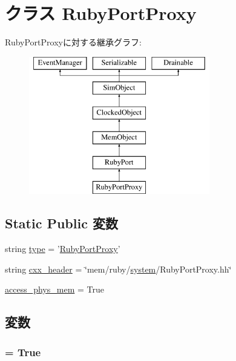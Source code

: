 \hypertarget{classSequencer_1_1RubyPortProxy}{
\section{クラス RubyPortProxy}
\label{classSequencer_1_1RubyPortProxy}
}
RubyPortProxyに対する継承グラフ:\begin{figure}[H]
\begin{center}
\leavevmode
\includegraphics[height=6cm]{classSequencer_1_1RubyPortProxy}
\end{center}
\end{figure}
\subsection*{Static Public 変数}
\begin{DoxyCompactItemize}
\item 
string \hyperlink{classSequencer_1_1RubyPortProxy_acce15679d830831b0bbe8ebc2a60b2ca}{type} = '\hyperlink{classSequencer_1_1RubyPortProxy}{RubyPortProxy}'
\item 
string \hyperlink{classSequencer_1_1RubyPortProxy_a17da7064bc5c518791f0c891eff05fda}{cxx\_\-header} = \char`\"{}mem/ruby/\hyperlink{classSequencer_1_1RubyPort_ab737471139f5a296e5b26e8a0e1b0744}{system}/RubyPortProxy.hh\char`\"{}
\item 
\hyperlink{classSequencer_1_1RubyPortProxy_a6b007d00105ce28d41448c23f68c5ec1}{access\_\-phys\_\-mem} = True
\end{DoxyCompactItemize}


\subsection{変数}
\hypertarget{classSequencer_1_1RubyPortProxy_a6b007d00105ce28d41448c23f68c5ec1}{
\subsubsection[{access\_\-phys\_\-mem}]{ = True}}
\label{classSequencer_1_1RubyPortProxy_a6b007d00105ce28d41448c23f68c5ec1}


